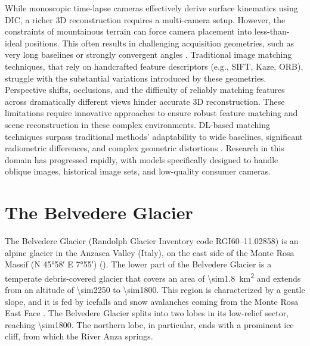 While monoscopic time-lapse cameras effectively derive surface kinematics using DIC, a richer 3D reconstruction requires a multi-camera setup. 
However, the constraints of mountainous terrain can force camera placement into less-than-ideal positions. 
This often results in challenging acquisition geometries, such as very long baselines or strongly convergent angles \citep{ioli2024deep}.
Traditional image matching techniques, that rely on handcrafted feature descriptors (e.g., SIFT, Kaze, ORB), struggle with the substantial variations introduced by these geometries.  Perspective shifts, occlusions, and the difficulty of reliably matching features across dramatically different views hinder accurate 3D reconstruction. 
These limitations require innovative approaches to ensure robust feature matching and scene reconstruction in these complex environments.
DL-based matching techniques surpass traditional methods' adaptability to wide baselines, significant radiometric differences, and complex geometric distortions \cite{Yao_2021}. 
Research in this domain has progressed rapidly, with models specifically designed to handle oblique images, historical image sets, and low-quality consumer cameras.

\section{The Belvedere Glacier}\label{sec:1:belvedereglacier}

The Belvedere Glacier (Randolph Glacier Inventory code RGI60--11.02858) is an alpine
glacier in the Anzasca Valley (Italy), on the east side of the Monte Rosa Massif (N
\ang{45;58} E \ang{7;55}) ().
The lower part of the Belvedere Glacier is a temperate debris-covered glacier that
covers an area of \SI{\sim1.8}{\kilo\meter\squared} and extends from an altitude of \SI{\sim2250}{\masl} to \SI{\sim1800}{\masl}.
This region is characterized by a gentle slope, and it is fed by icefalls and snow
avalanches coming from the Monte Rosa East Face \citep{Haeberli2002}. 
The Belvedere Glacier splits into two lobes in its low-relief sector, reaching \SI{\sim1800}{\masl}.
The northern lobe, in particular, ends with a prominent ice cliff, from which the River
Anza springs.

